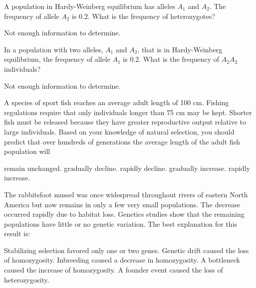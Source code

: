 \question
A population in Hardy-Weinberg equilibrium has alleles \textit{$A_1$} and \textit{$A_2$}. The frequency of allele \textit{$A_2$} is 0.2. What is the frequency of heterozygotes? 

\begin{choices}
	\choice Not enough information to determine. %
\end{choices}

\question
In a population with two alleles, $A_1$ and $A_2$, that is in Hardy-Weinberg equilibrium, the frequency of allele $A_1$ is 0.2. What is the frequency of $A_2A_2$ individuals? 

\begin{choices}
	\choice Not enough information to determine. %
\end{choices}

\question
A species of sport fish reaches an average adult length of 100 cm. Fishing regulations require that only individuals longer than 75 cm may be kept. Shorter fish must be released because they have greater reproductive output relative to large individuals. Based on your knowledge of natural selection, you should predict that over hundreds of generations the average length of the adult fish population will

\begin{choices}
\correctchoice remain unchanged. %
\choice gradually decline. %
\choice rapidly decline. %
\choice gradually increase. %
\choice rapidly increase. %
\end{choices}


\question
The rabbitsfoot mussel was once widespread throughout rivers of eastern North America but now remains in only a few very small populations. The decrease occurred rapidly due to habitat loss. Genetics studies show that the remaining populations have little or no genetic variation. The best explanation for this result is:

\begin{choices}
\choice Stabilizing selection favored only one or two genes. %
\choice Genetic drift caused the loss of homozygosity. %
\choice Inbreeding caused a decrease in homozygosity. %
\correctchoice A bottleneck caused the increase of homozygosity. %
\choice A founder event caused the loss of heterozygosity. %
\end{choices}

